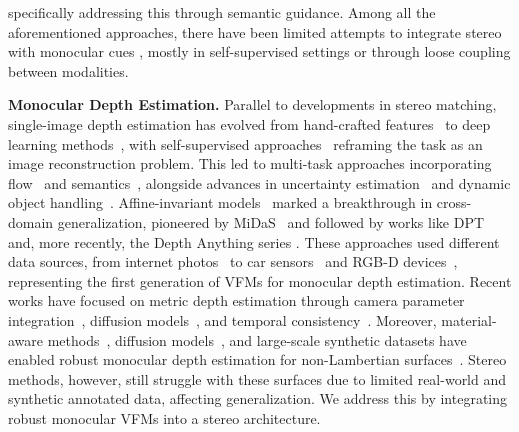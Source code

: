\cite{costanzino2023learning} specifically addressing this through semantic guidance. Among all the aforementioned approaches, there have been limited attempts to integrate stereo with monocular cues \cite{Chen_2021_ICCV, aleotti2020reversing, watson2020learning}, mostly in self-supervised settings or through loose coupling between modalities.
    
    \textbf{Monocular Depth Estimation.} Parallel to developments in stereo matching, single-image depth estimation has evolved from hand-crafted features~\cite{Saxena2008} to deep learning methods~\cite{chen2016single, eigen2014depth, laina2016deeper, Ramamonjisoa_2020_CVPR, wang2020cliffnet}, with self-supervised approaches~\cite{godard2017unsupervised, zhou2017unsupervised, mahjourian2018unsupervised, godard2019monodepth2, poggi2018learning, watson2019depthhints, zhao2022monovit}  reframing the task as an image reconstruction problem. This led to multi-task approaches incorporating flow~\cite{zou2018df, yin2018geonet, ranjan2019competitive, tosi2020distilled} and semantics~\cite{zama2019geometry, guizilini2020semantically}, alongside advances in uncertainty estimation~\cite{poggi2020uncertainty, hornauer2022gradient} and dynamic object handling~\cite{klingner2020self, sun2023dynamodepth, moon2023ground}.
    Affine-invariant models~\cite{Ranftl2022, Ranftl2021, Yin2020, Eftekhar2021} marked a breakthrough in cross-domain generalization, pioneered by MiDaS~\cite{Ranftl2022} and followed by works like DPT~\cite{Ranftl2021} and, more recently, the Depth Anything series \cite{depth_anything_v1}. These approaches used different data sources, from internet photos~\cite{li2018megadepth,Yin2020,Spencer2023c,Spencer2024} to car sensors~\cite{geiger2012we,menze2015object} and RGB-D devices~\cite{Silberman2012, Cho2021}, representing the first generation of VFMs for monocular depth estimation. Recent works have focused on metric depth estimation through camera parameter integration~\cite{Yin2023, hu2024metric3dv2,Guizilini2023}, diffusion models~\cite{Ji2023, Duan2023, Saxena2023, Saxena2023b, ke2023repurposing, fu2024geowizard}, and temporal consistency~\cite{shao2024learning, hu2024depthcrafter}.
    Moreover, material-aware methods~\cite{costanzino2023learning}, diffusion models~\cite{tosi2024diffusion}, and large-scale synthetic datasets have enabled robust monocular depth estimation for non-Lambertian surfaces~\cite{depth_anything_v2}. Stereo methods, however, still struggle with these surfaces due to limited real-world and synthetic annotated data, affecting generalization. We address this by integrating robust monocular VFMs into a stereo architecture.

